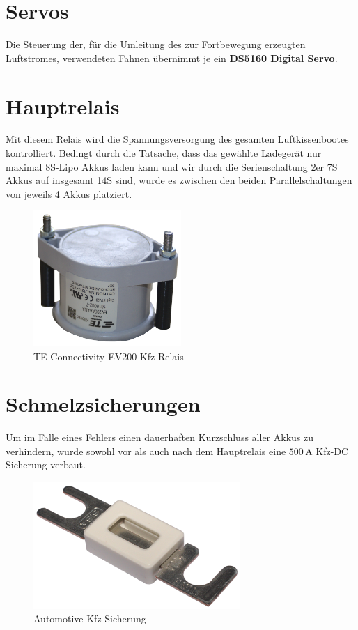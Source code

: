 \section{Servos}
Die Steuerung der, für die Umleitung des zur Fortbewegung erzeugten Luftstromes, verwendeten Fahnen übernimmt je ein \textbf{DS5160 Digital Servo}.

\newpage
\section{Hauptrelais}
Mit diesem Relais wird die Spannungsversorgung des gesamten Luftkissenbootes kontrolliert. Bedingt durch die Tatsache, dass das gewählte Ladegerät nur maximal 8S-Lipo Akkus laden kann und wir durch die Serienschaltung 2er 7S Akkus auf insgesamt 14S sind, 
wurde es zwischen den beiden Parallelschaltungen von jeweils 4 Akkus platziert. 
\begin{figure}[h]
    \centering
    \includegraphics[width=0.5\textwidth]{Fotos/Hauptrelais.png}
    \caption{TE Connectivity EV200 Kfz-Relais}
\end{figure}

\newpage
\section{Schmelzsicherungen\label{sec:schmelzsicherungen}}
Um im Falle eines Fehlers einen dauerhaften Kurzschluss aller Akkus zu verhindern, wurde sowohl vor als auch nach dem Hauptrelais eine $500\,\mathrm{A}$ Kfz-DC Sicherung verbaut.
\begin{figure}[h]
    \centering
    \includegraphics[width=0.7\textwidth]{Fotos/kfz_Sicherung.png}
    \caption{Automotive Kfz Sicherung}
\end{figure}
\newpage
